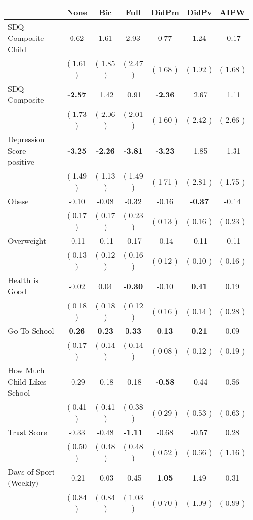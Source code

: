 \begin{tabular}{l c c c c c c}
\toprule
 & None & Bic & Full & DidPm & DidPv & AIPW \\
\midrule
SDQ Composite - Child &      0.62 &      1.61 &      2.93 &      0.77 &      1.24 &     -0.17 \\
& (     1.61 ) & (     1.85 ) & (     2.47 ) & (     1.68 ) & (     1.92 ) & (     1.68 ) \\
SDQ Composite & \textbf{     -2.57 } &     -1.42 &     -0.91 & \textbf{     -2.36 } &     -2.67 &     -1.11 \\
& (     1.73 ) & (     2.06 ) & (     2.01 ) & (     1.60 ) & (     2.42 ) & (     2.66 ) \\
Depression Score - positive & \textbf{     -3.25 } & \textbf{     -2.26 } & \textbf{     -3.81 } & \textbf{     -3.23 } &     -1.85 &     -1.31 \\
& (     1.49 ) & (     1.13 ) & (     1.49 ) & (     1.71 ) & (     2.81 ) & (     1.75 ) \\
Obese &     -0.10 &     -0.08 &     -0.32 &     -0.16 & \textbf{     -0.37 } &     -0.14 \\
& (     0.17 ) & (     0.17 ) & (     0.23 ) & (     0.13 ) & (     0.16 ) & (     0.23 ) \\
Overweight &     -0.11 &     -0.11 &     -0.17 &     -0.14 &     -0.11 &     -0.11 \\
& (     0.13 ) & (     0.12 ) & (     0.16 ) & (     0.12 ) & (     0.10 ) & (     0.16 ) \\
Health is Good &     -0.02 &      0.04 & \textbf{     -0.30 } &     -0.10 & \textbf{      0.41 } &      0.19 \\
& (     0.18 ) & (     0.18 ) & (     0.12 ) & (     0.16 ) & (     0.14 ) & (     0.28 ) \\
Go To School & \textbf{      0.26 } & \textbf{      0.23 } & \textbf{      0.33 } & \textbf{      0.13 } & \textbf{      0.21 } &      0.09 \\
& (     0.17 ) & (     0.14 ) & (     0.14 ) & (     0.08 ) & (     0.12 ) & (     0.19 ) \\
How Much Child Likes School &     -0.29 &     -0.18 &     -0.18 & \textbf{     -0.58 } &     -0.44 &      0.56 \\
& (     0.41 ) & (     0.41 ) & (     0.38 ) & (     0.29 ) & (     0.53 ) & (     0.63 ) \\
Trust Score &     -0.33 &     -0.48 & \textbf{     -1.11 } &     -0.68 &     -0.57 &      0.28 \\
& (     0.50 ) & (     0.48 ) & (     0.48 ) & (     0.52 ) & (     0.66 ) & (     1.16 ) \\
Days of Sport (Weekly) &     -0.21 &     -0.03 &     -0.45 & \textbf{      1.05 } &      1.49 &      0.31 \\
& (     0.84 ) & (     0.84 ) & (     1.03 ) & (     0.70 ) & (     1.09 ) & (     0.99 ) \\
\bottomrule
\end{tabular}
